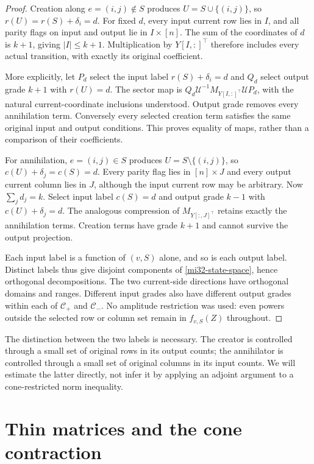 \documentclass[11pt]{article}
\theoremstyle{definition}
\theoremstyle{remark}
\begin{document}
\begin{proof}
Creation along $e=(i,j)\notin S$ produces
$U=S\cup\{(i,j)\}$, so $r(U)=r(S)+\delta_i=d$.
For fixed $d$, every input current row lies in $I$, and all parity
flags on input and output lie in $I\times[n]$.
The sum of the coordinates of $d$ is $k+1$, giving $|I|\le k+1$.
Multiplication by $Y[I,:]^\top$ therefore includes every actual
transition, with exactly its original coefficient.

More explicitly, let $P_d$ select the input label $r(S)+\delta_i=d$
and $Q_d$ select output grade $k+1$ with $r(U)=d$. The sector map is
$Q_d\mathcal U^{-1}M_{Y[I,:]^\top}\mathcal U P_d$, with the natural
current-coordinate inclusions understood. Output grade removes every
annihilation term. Conversely every selected creation term satisfies
the same original input and output conditions. This proves equality
of maps, rather than a comparison of their coefficients.

For annihilation, $e=(i,j)\in S$ produces
$U=S\setminus\{(i,j)\}$, so $c(U)+\delta_j=c(S)=d$.
Every parity flag lies in $[n]\times J$ and every output current
column lies in $J$, although the input current row may be arbitrary.
Now $\sum_jd_j=k$. Select input label $c(S)=d$ and output grade
$k-1$ with $c(U)+\delta_j=d$. The analogous compression of
$M_{Y[:,J]^\top}$ retains exactly the annihilation terms.
Creation terms have grade $k+1$ and cannot survive the output projection.

Each input label is a function of $(v,S)$ alone, and so is each output
label. Distinct labels thus give disjoint components of
\eqref{mi32-state-space}, hence orthogonal decompositions. The two
current-side directions have orthogonal domains and ranges. Different
input grades also have different output grades within each of
$\mathcal C_+$ and $\mathcal C_-$. No amplitude restriction was
used: even powers outside the selected row or column set remain in
$f_{v,S}(Z)$ throughout.
\end{proof}

The distinction between the two labels is necessary. The creator is
controlled through a small set of original rows in its output counts;
the annihilator is controlled through a small set of original columns
in its input counts. We will estimate the latter directly, not infer
it by applying an adjoint argument to a cone-restricted norm inequality.

\section{Thin matrices and the cone contraction}
\label{mi32-thin-section}
\end{document}
